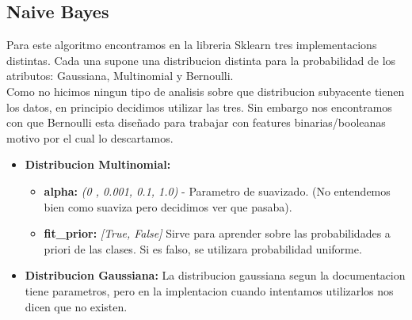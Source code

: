 \subsection{Naive Bayes}

Para este algoritmo encontramos en la libreria Sklearn tres implementacions distintas. Cada una supone una distribucion distinta para la probabilidad de los atributos: Gaussiana, Multinomial y Bernoulli.\\


Como no hicimos ningun tipo de analisis sobre que distribucion subyacente tienen los datos, en principio decidimos utilizar las tres. Sin embargo nos encontramos con que Bernoulli esta diseñado para trabajar con features binarias/booleanas motivo por el cual lo descartamos.


\begin{itemize}
\item \textbf{Distribucion Multinomial:} 
	\begin{itemize}
	\item \textbf{alpha:} \textit{(0 , 0.001, 0.1, 1.0)} - Parametro de suavizado. (No entendemos bien como suaviza pero decidimos ver que pasaba).
	\item \textbf{fit\_prior:} \textit{[True, False]} Sirve para aprender sobre las probabilidades a priori de las clases. Si es falso, se utilizara probabilidad uniforme.
	\end{itemize}


\item \textbf{Distribucion Gaussiana:} La distribucion gaussiana segun la documentacion tiene parametros, pero en la implentacion cuando intentamos utilizarlos nos dicen que no existen.

\end{itemize}





